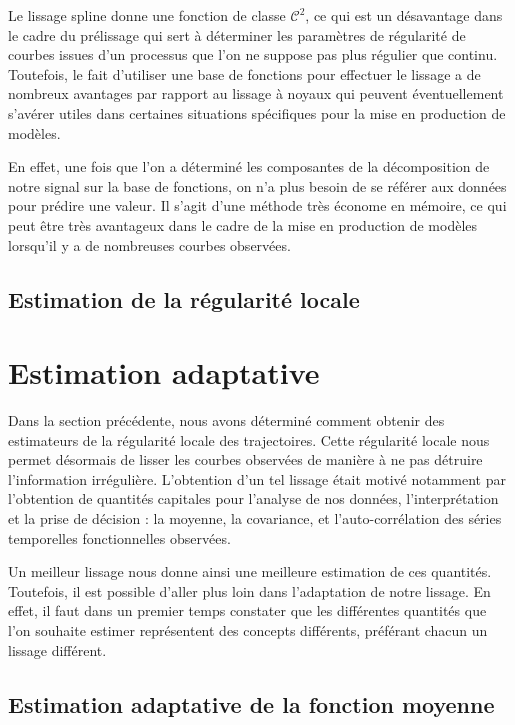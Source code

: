 Le lissage spline donne une fonction de classe $\mathcal C^2$, ce qui est un désavantage dans le cadre du prélissage qui sert à déterminer les paramètres de régularité de courbes issues d'un processus que l'on ne suppose pas plus régulier que continu. Toutefois, le fait d'utiliser une base de fonctions pour effectuer le lissage a de nombreux avantages par rapport au lissage à noyaux qui peuvent éventuellement s'avérer utiles dans certaines situations spécifiques pour la mise en production de modèles.

En effet, une fois que l'on a déterminé les composantes de la décomposition de notre signal sur la base de fonctions, on n'a plus besoin de se référer aux données pour prédire une valeur. Il s'agit d'une méthode très économe en mémoire, ce qui peut être très avantageux dans le cadre de la mise en production de modèles lorsqu'il y a de nombreuses courbes observées.




\subsection{Estimation de la régularité locale}


\section{Estimation adaptative}

Dans la section précédente, nous avons déterminé comment obtenir des estimateurs de la régularité locale des trajectoires. Cette régularité locale nous permet désormais de lisser les courbes observées de manière à ne pas détruire l'information irrégulière. L'obtention d'un tel lissage était motivé notamment par l'obtention de quantités capitales pour l'analyse de nos données, l'interprétation et la prise de décision : la moyenne, la covariance, et l'auto-corrélation des séries temporelles fonctionnelles observées. 

Un meilleur lissage nous donne ainsi une meilleure estimation de ces quantités. Toutefois, il est possible d'aller plus loin dans l'adaptation de notre lissage. En effet, il faut dans un premier temps constater que les différentes quantités que l'on souhaite estimer représentent des concepts différents, préférant chacun un lissage différent.

\smallskip  



\subsection{Estimation adaptative de la fonction moyenne}


